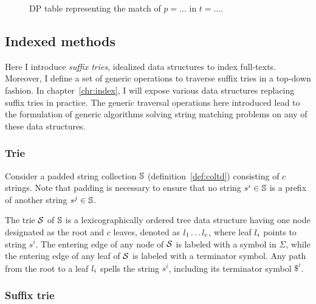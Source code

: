 \begin{figure}[h]
\begin{center}
\caption[Example of approximate string matching via DP]{DP table representing the match of $p=...$ in $t=...$.}
\label{fig:asm-dp}

\end{center}
\end{figure}


\subsection{Indexed methods}
\label{sub:introindex}

Here I introduce \emph{suffix tries}, idealized data structures to index full-texts.
Moreover, I define a set of generic operations to traverse suffix tries in a top-down fashion.
In chapter~\ref{chr:index}, I will expose various data structures replacing suffix tries in practice.
The generic traversal operations here introduced lead to the formulation of generic algorithms solving string matching problems on any of these data structures.

\subsubsection{Trie}

Consider a padded string collection $\mathbb {S}$ (definition~\ref{def:coltd}) consisting of $c$ strings.
Note that padding is necessary to ensure that no string $s^i \in \mathbb {S}$ is a prefix of another string $s^j \in \mathbb {S}$.
\begin{definition}
The trie $\mathcal {S}$ of $\mathbb {S}$ is a lexicographically ordered tree data structure having one node designated as the root and $c$ leaves, denoted as $l_1 \dots l_c$, where leaf $l_i$ points to string $s^i$.
The entering edge of any node of $\mathcal {S}$ is labeled with a symbol in $\Sigma$, while the entering edge of any leaf of $\mathcal {S}$ is labeled with a terminator symbol.
Any path from the root to a leaf $l_i$ spells the string $s^i$, including its terminator symbol $\$^i$.
\end{definition}

\subsubsection{Suffix trie}

